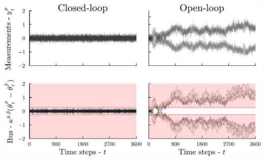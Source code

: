 \begin{frame}[t]
\begin{columns}
	\begin{center}
		\includegraphics[width=\textwidth]{figs/PGrid_Simulation_Optimized}
	\end{center}

\end{columns}

\end{frame}
